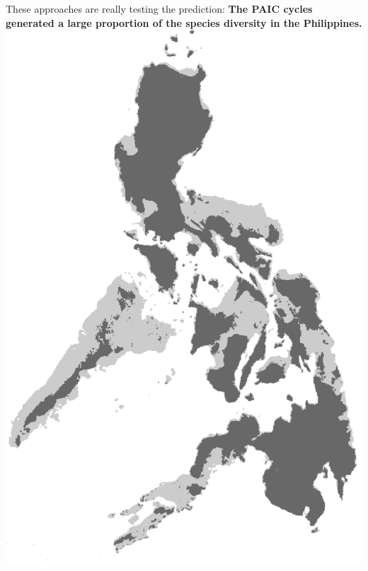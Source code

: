 \begin{frame}
\begin{columns}[c]
            These approaches are really testing the prediction:
            {\bf The PAIC cycles generated a large proportion of the species
            diversity in the Philippines.}
            \includegraphics[width=\textwidth]{images/maps/Philippines.png}
    \end{columns}
\end{frame}


